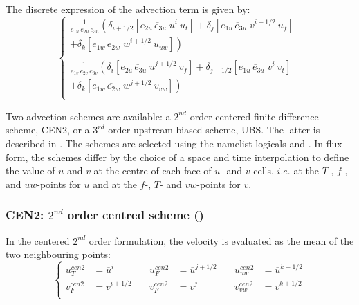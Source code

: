 \documentclass[../tex_main/NEMO_manual]{subfiles}
\begin{document}
The discrete expression of the advection term is given by:
\begin{equation} \label{eq:dynadv}
\left\{ 
\begin{aligned}
\frac{1}{e_{1u}\,e_{2u}\,e_{3u}} 
\left(      \delta _{i+1/2} \left[ \overline{e_{2u}\,e_{3u}\;u }^{i       }  \ u_t      \right]    
          + \delta _{j       } \left[ \overline{e_{1u}\,e_{3u}\;v }^{i+1/2}  \ u_f      \right] \right.  \ \;   \\
\left.   + \delta _{k      } \left[ \overline{e_{1w}\,e_{2w}\;w}^{i+1/2}  \ u_{uw} \right] \right)   \\
\\
\frac{1}{e_{1v}\,e_{2v}\,e_{3v}} 
\left(     \delta _{i       } \left[ \overline{e_{2u}\,e_{3u }\;u }^{j+1/2} \ v_f       \right] 
         + \delta _{j+1/2} \left[ \overline{e_{1u}\,e_{3u }\;v }^{i       } \ v_t       \right] \right.  \ \, \, \\
\left.  + \delta _{k      } \left[ \overline{e_{1w}\,e_{2w}\;w}^{j+1/2} \ v_{vw}  \right] \right) \\
\end{aligned}
\right.
\end{equation}

Two advection schemes are available:
a $2^{nd}$ order centered finite difference scheme, CEN2,
or a $3^{rd}$ order upstream biased scheme, UBS.
The latter is described in \citet{Shchepetkin_McWilliams_OM05}.
The schemes are selected using the namelist logicals  and . 
In flux form, the schemes differ by the choice of a space and time interpolation to define the value of
$u$ and $v$ at the centre of each face of $u$- and $v$-cells, $i.e.$ at the $T$-, $f$-,
and $uw$-points for $u$ and at the $f$-, $T$- and $vw$-points for $v$. 

\subsubsection{CEN2: $2^{nd}$ order centred scheme (\protect{})}
\label{subsec:DYN_adv_cen2}

In the centered $2^{nd}$ order formulation, the velocity is evaluated as the mean of the two neighbouring points:
\begin{equation} \label{eq:dynadv_cen2}
\left\{ 		\begin{aligned}
 u_T^{cen2} &=\overline u^{i }       \quad &  u_F^{cen2} &=\overline u^{j+1/2}  \quad &  u_{uw}^{cen2} &=\overline u^{k+1/2}   \\
 v_F^{cen2} &=\overline v ^{i+1/2} \quad & v_F^{cen2} &=\overline v^j		\quad &  v_{vw}^{cen2} &=\overline v ^{k+1/2}  \\
\end{aligned}      \right.
\end{equation} 
\end{document}
